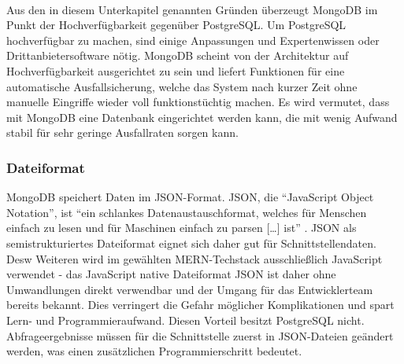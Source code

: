 \paragraph{}
Aus den in diesem Unterkapitel genannten Gründen überzeugt MongoDB im Punkt der Hochverfügbarkeit gegenüber PostgreSQL.
Um PostgreSQL hochverfügbar zu machen, sind einige Anpassungen und Expertenwissen oder Drittanbietersoftware nötig.
MongoDB scheint von der Architektur auf Hochverfügbarkeit ausgerichtet zu sein und liefert Funktionen für eine automatische Ausfallsicherung, welche das System nach kurzer Zeit ohne manuelle Eingriffe wieder voll funktionstüchtig machen.
Es wird vermutet, dass mit MongoDB eine Datenbank eingerichtet werden kann, die mit wenig Aufwand stabil für sehr geringe Ausfallraten sorgen kann.

\subsubsection{Dateiformat}
MongoDB speichert Daten im JSON-Format. 
JSON, die \enquote{JavaScript Object Notation}, ist \enquote{ein schlankes Datenaustauschformat, welches für Menschen einfach zu lesen und für Maschinen einfach zu parsen [\dots] ist} \cite{JSON1}. 
JSON als semistrukturiertes Dateiformat eignet sich daher gut für Schnittstellendaten.\\
Desw Weiteren wird im gewählten MERN-Techstack ausschließlich JavaScript verwendet - das JavaScript native Dateiformat JSON ist daher ohne Umwandlungen direkt verwendbar und der Umgang für das Entwicklerteam bereits bekannt.
Dies verringert die Gefahr möglicher Komplikationen und spart Lern- und Programmieraufwand.
Diesen Vorteil besitzt PostgreSQL nicht.
Abfrageergebnisse müssen für die Schnittstelle zuerst in JSON-Dateien geändert werden, was einen zusätzlichen Programmierschritt bedeutet.

